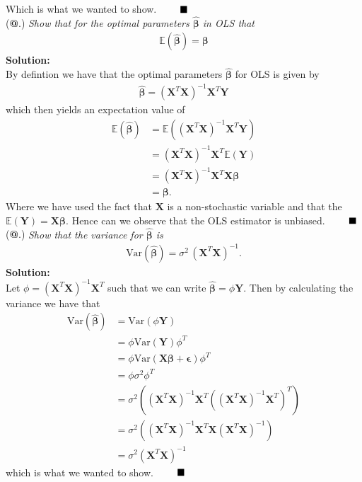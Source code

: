 \documentclass[12pt,
               a4paper,
               article,
               oneside,
               norsk,oldfontcommands]{memoir}
\makeatletter
\newcommand*{\rom}[1]{\expandafter\@slowromancap\romannumeral #1@}
\newcommand{\Q}{ \qquad \hfill \blacksquare}
\newcommand{\spaze}{\vspace{4mm}\\}
\makeatother
\begin{document}
Which is what we wanted to show. $\Q$ \spaze 
(\textbf{\rom{3}}.) \emph{Show that for the optimal parameters $\boldsymbol{\hat{\beta}}$ in OLS that}
\begin{align*}
\mathbb{E}(\boldsymbol{\hat{\beta}}) = \boldsymbol{\beta}
\end{align*} 
\textbf{Solution:} \spaze 
By defintion we have that the optimal parameters $\boldsymbol{\hat{\beta}}$ for OLS is given by 
\begin{align*}
\boldsymbol{\hat{\beta}} = \left( \mathbf{X}^T \mathbf{X} \right)^{-1} \mathbf{X}^T \mathbf{Y} 
\end{align*}
which then yields an expectation value of 
\begin{align*}
\mathbb{E}(\boldsymbol{\hat{\beta}}) &= \mathbb{E} \left( \left( \mathbf{X}^T \mathbf{X} \right)^{-1} \mathbf{X}^T \mathbf{Y} \right) \\[5pt]
&= \left( \mathbf{X}^T \mathbf{X} \right)^{-1} \mathbf{X}^T  \mathbb{E}(\mathbf{Y}) \\[5pt]
&= \left( \mathbf{X}^T \mathbf{X} \right)^{-1} \mathbf{X}^T \mathbf{X} \boldsymbol{\beta} \\[5pt] 
&= \boldsymbol{\beta}.
\end{align*}
Where we have used the fact that $\mathbf{X}$ is a non-stochastic variable and that the $\mathbb{E}(\mathbf{Y}) = \mathbf{X}\boldsymbol{\beta}$.  Hence can we observe that the OLS estimator is unbiased. $\Q$ \spaze 
(\textbf{\rom{4}}.) \emph{Show that the variance for $\boldsymbol{\hat{\beta}}$ is}
\begin{align*}
\text{Var}(\boldsymbol{\hat{\beta}}) = \sigma^2 \, (\mathbf{X}^{T} \mathbf{X})^{-1}.
\end{align*}
\textbf{Solution:} \spaze 
Let $\phi = \left( \mathbf{X}^T \mathbf{X} \right)^{-1} \mathbf{X}^T $ such that we can write $ \boldsymbol{\hat{\beta}} = \phi \mathbf{Y} $. Then by calculating the variance we have that 
\begin{align}
\text{Var}(\boldsymbol{\hat{\beta}}) &= \text{Var}(\phi \mathbf{Y})  \\[5pt]
&= \phi \text{Var}(\mathbf{Y}) \phi^T \label{eq4} \\[5pt] 
&=  \phi \text{Var}(\mathbf{X} \boldsymbol{\beta} + \boldsymbol{\epsilon}) \phi^T \\[5pt] 
&=  \phi \sigma^2 \phi^T  \label{eq1} \\[5pt]
&= \sigma^2 \left(  \left( \mathbf{X}^T \mathbf{X} \right)^{-1} \mathbf{X}^T   \left(  \left( \mathbf{X}^T \mathbf{X} \right)^{-1} \mathbf{X}^T  \right)^T \right) \\[5pt]
&=  \sigma^2 \left(\left( \mathbf{X}^T \mathbf{X} \right)^{-1} \mathbf{X}^T  \mathbf{X}  \left( \mathbf{X}^T \mathbf{X} \right)^{-1} \right) \label{eq2}  \\[5pt]
&= \sigma^2 \left( \mathbf{X}^T \mathbf{X} \right)^{-1}  
\end{align}
which is what we wanted to show. $\Q$
\end{document}
